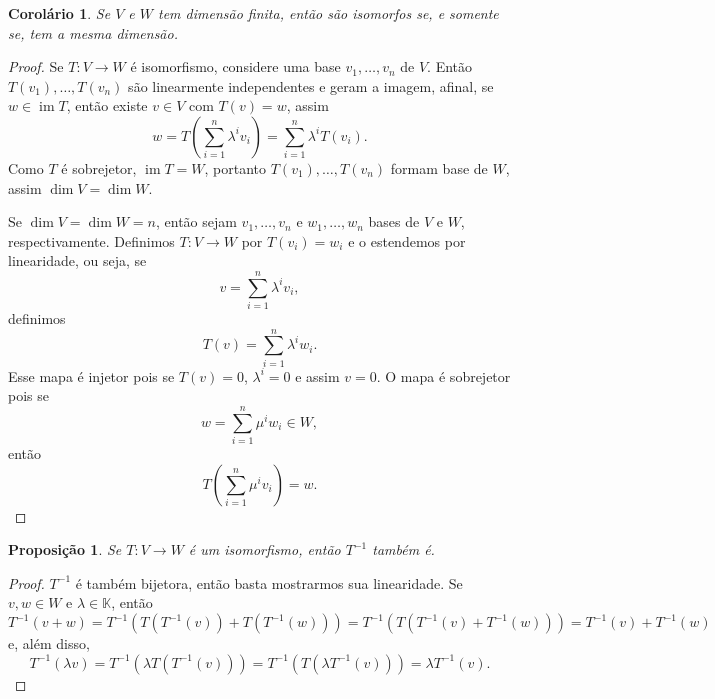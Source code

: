 \documentclass{article}
\newtheorem{proposition}[definition]{Proposição}
\newtheorem{corollary}[definition]{Corolário}
\DeclareMathOperator{\im}{im}
\begin{document}
\begin{corollary}
    Se $V$ e $W$ tem dimensão finita, então são isomorfos se, e somente se, tem a mesma dimensão.
\end{corollary}
\begin{proof}
    Se $T \colon V \to W$ é isomorfismo, considere uma base $v_1, \dots, v_n$ de $V$. Então $T(v_1), \dots, T(v_n)$ são linearmente independentes e geram a imagem, afinal, se $w \in \im T$, então existe $v \in V$ com $T(v) = w$, assim \begin{equation}
        w = T\left(\sum_{i = 1}^n \lambda^i v_i\right) = \sum_{i = 1}^n \lambda^i T(v_i).
    \end{equation} Como $T$ é sobrejetor, $\im T = W$, portanto $T(v_1), \dots, T(v_n)$ formam base de $W$, assim $\dim V = \dim W$.

    Se $\dim V = \dim W = n$, então sejam $v_1, \dots, v_n$ e $w_1, \dots, w_n$ bases de $V$ e $W$, respectivamente. Definimos $T \colon V \to W$ por $T(v_i) = w_i$ e o estendemos por linearidade, ou seja, se \begin{equation}
        v = \sum_{i = 1}^n \lambda^i v_i,
    \end{equation} definimos \begin{equation}
        T(v) = \sum_{i = 1}^n \lambda^i w_i.
    \end{equation} Esse mapa é injetor pois se $T(v) = 0$, $\lambda^i = 0$ e assim $v = 0$. O mapa é sobrejetor pois se \begin{equation}
        w = \sum_{i = 1}^n \mu^i w_i \in W,
    \end{equation} então \begin{equation}
        T\left(\sum_{i = 1}^n \mu^i v_i\right) = w.
    \end{equation}
\end{proof}

\begin{proposition}
    Se $T \colon V \to W$ é um isomorfismo, então $T^{-1}$ também é.
\end{proposition}
\begin{proof}
    $T^{-1}$ é também bijetora, então basta mostrarmos sua linearidade. Se $v, w \in W$ e $\lambda \in \mathbb{K}$, então \begin{equation}
        T^{-1}(v + w) = T^{-1}(T(T^{-1}(v)) + T(T^{-1}(w))) = T^{-1}(T(T^{-1}(v) + T^{-1}(w))) = T^{-1}(v) + T^{-1}(w)
    \end{equation} e, além disso, \begin{equation}
        T^{-1}(\lambda v) = T^{-1}(\lambda T(T^{-1}(v))) = T^{-1}(T(\lambda T^{-1}(v))) = \lambda T^{-1}(v).
    \end{equation}
\end{proof}
\end{document}
